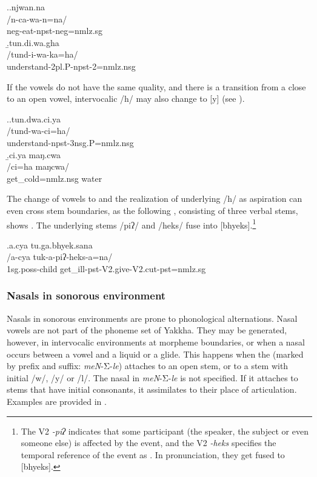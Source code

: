 \ex.\a.\glll njwan.na\\
/n-ca-wa-n=na/\\
{\sc neg-}eat{\sc [3sg.A]-npst-neg=nmlz.sg}\\
\b.\glll  tun.di.wa.gha\\
/tund-i-wa-ka=ha/\\
understand{\sc [3.A]-2pl.P-npst-2=nmlz.nsg}\\

If the vowels do not have the same quality, and there is a transition from a close to an open vowel, intervocalic /h/ may also change to [y]  (see \Next).

\ex.\a.\glll   tun.dwa.ci.ya\\
/tund-wa-ci=ha/\\
understand{\sc [3sg.A]-npst-3nsg.P=nmlz.nsg}\\
\b.\glll   ci.ya maŋ.cwa\\
/ci=ha maŋcwa/\\
get\_cold{\sc =nmlz.nsg} water\\

The change of vowels to  and the realization of underlying /h/ as aspiration can even cross stem boundaries, as the following , consisting of three verbal stems, shows \Next. The underlying stems /piʔ/ and /heks/ fuse into [bhyeks].\footnote{The V2 \emph{-piʔ} indicates that some participant (the speaker, the subject or even someone else) is affected by the event, and the V2 \emph{-heks} specifies the temporal reference of the event as . In pronunciation, they get fused to [bhyeks].} 


\ex.\glll a.cya tu.ga.bhyek.sana\\
/a-cya tuk-a-piʔ-heks-a=na/\\
{\sc 1sg.poss}-child  get\_ill{\sc [3sg]-pst-V2.give-V2.cut-pst=nmlz.sg}\\


\subsubsection{Nasals in sonorous environment}\label{nas-son}

Nasals in sonorous environments are prone to phonological alternations. Nasal vowels are not part of the phoneme set of Yakkha. They may be generated, however, in  intervocalic environments at morpheme boundaries, or when a nasal occurs between a vowel and a liquid or a glide. This happens when the  (marked by prefix and suffix: \emph{meN}-Σ-\emph{le}) attaches to an open stem, or to a stem with initial /w/, /y/ or /l/. The nasal in \emph{meN}-Σ-\emph{le} is not specified. If it attaches to stems that have initial consonants, it assimilates to their place of articulation. Examples are provided in . 

